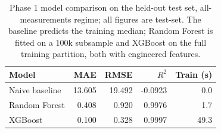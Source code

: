 \begin{table}[!t]
    \centering
    \caption{Phase 1 model comparison on the held-out test set, all-measurements regime; all figures are test-set. The baseline predicts the training median; Random Forest is fitted on a 100k subsample and XGBoost on the full training partition, both with engineered features.}
    \label{tab:main}
    \small
    \setlength{\tabcolsep}{4pt}
    \begin{tabular}{lrrrr}
        \toprule
        Model & MAE & RMSE & $R^2$ & Train (s) \\
        \midrule
        Naive baseline & 13.605 & 19.492 & -0.0923 & 0.0 \\
        Random Forest & 0.408 & 0.920 & 0.9976 & 1.7 \\
        XGBoost & 0.100 & 0.328 & 0.9997 & 49.3 \\
        \bottomrule
    \end{tabular}
\end{table}

